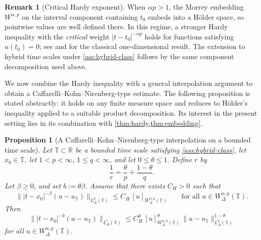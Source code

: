 \documentclass[11pt,a4paper]{article}
\numberwithin{equation}{section}
\newtheorem{proposition}[proposition]{Proposition}
\theoremstyle{definition}
\newtheorem{remark}[remark]{Remark}
\newcommand{\R}{\mathbb{R}}
\newcommand{\T}{\mathbb{T}}
\begin{document}
\begin{remark}[Critical Hardy exponent]\label{rem:critical-hardy}
When $\alpha p>1$, the Morrey embedding
$W^{\alpha,p}$ on the interval component containing $t_0$ embeds into a H\"older space, so pointwise values are well defined there. In this regime, a
stronger Hardy inequality with the \emph{critical} weight
$|t-t_0|^{-\alpha p}$ holds for functions satisfying $u(t_0)=0$; see
\cite{Dyda2004} and \cite[Theorem~1.1]{FrankSeiringer2008} for the
classical one-dimensional result. The extension to hybrid time scales under
\cref{ass:hybrid-class} follows by the same component decomposition used
above.
\end{remark}

We now combine the Hardy inequality with a general interpolation argument to
obtain a Caffarelli--Kohn--Nirenberg-type estimate. The following proposition
is stated abstractly: it holds on any finite measure space and reduces to
H\"older's inequality applied to a suitable product decomposition. Its
interest in the present setting lies in its combination with
\cref{thm:hardy,thm:embedding}.

\begin{proposition}[A Caffarelli--Kohn--Nirenberg-type interpolation on a
bounded time scale]
\label{prop:CKN-type}
Let $\T\subset\R$ be a bounded time scale satisfying
\cref{ass:hybrid-class}, let $x_0\in\T$, let $1<p<\infty$,
$1\le q<\infty$, and let $0\le \theta\le1$. Define $r$ by
\[
\frac1r=\frac{\theta}{p}+\frac{1-\theta}{q}.
\]
Let $\beta\ge0$, and set $b:=\theta\beta$. Assume that there exists
$C_H>0$ such that
\[
\bigl\||t-x_0|^{-\beta}(u-u_{\T})\bigr\|_{L^p_\Delta(\T)}
\le
C_H\,[u]_{W^{\alpha,p}_\Delta(\T)}
\qquad\text{for all }u\in W^{\alpha,p}_\Delta(\T).
\]
Then
\begin{equation}\label{eq:ckn-abstract}
\bigl\||t-x_0|^{-b}(u-u_{\T})\bigr\|_{L^r_\Delta(\T)}
\le
C_H^{\theta}\,[u]_{W^{\alpha,p}_\Delta(\T)}^{\theta}
\,\|u-u_{\T}\|_{L^q_\Delta(\T)}^{1-\theta}
\end{equation}
for all $u\in W^{\alpha,p}_\Delta(\T)$.
\end{proposition}
\end{document}
